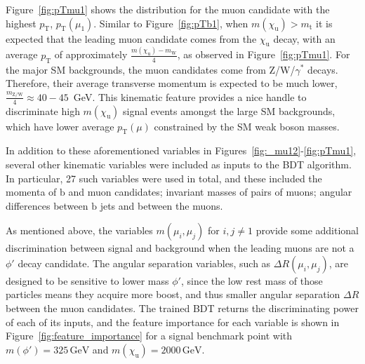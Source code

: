 Figure~\ref{fig:pTmu1} shows the  distribution for the muon candidate with the highest $p_{\mathrm{T}}$, $p_{\mathrm{T}}(\mu_{1})$. Similar to Figure~\ref{fig:pTb1}, when $m(\chi_\mathrm{u}) > m_{\mathrm{t}}$ it is expected that the leading muon candidate comes from the $\chi_\mathrm{u}$ decay, with an average $p_{\mathrm{T}}$ of approximately $\frac{m(\chi_\mathrm{u}) - m_{\mathrm{W}}}{4}$, as observed in Figure~\ref{fig:pTmu1}. For the major SM backgrounds, the muon candidates come from Z/W/$\gamma^{*}$ decays. Therefore, their average transverse momentum is expected to be much lower, $\frac{m_{\mathrm{Z/W}}}{4} \approx 40-45$~\textrm{GeV}. This kinematic feature provides a nice handle to discriminate high $m(\chi_\mathrm{u})$ signal events amongst the large SM backgrounds, which have lower average $p_{\textrm{T}}(\mu)$ constrained by the SM weak boson masses.

In addition to these aforementioned variables in Figures~\ref{fig:_mu12}-\ref{fig:pTmu1}, several other kinematic variables were included as inputs to the BDT algorithm. In particular, 27 such variables were used in total, and these included the momenta of $\mathrm{b}$ and muon candidates; invariant masses of pairs of muons; angular differences between $\mathrm{b}$ jets and between the muons. 

As mentioned above, the variables $m(\mu_{i}, \mu_{j})$ for $i, j \neq 1$ provide some additional discrimination between signal and background when the leading muons are not a $\phi'$ decay candidate. The angular separation variables, such as $\Delta R(\mu_{i}, \mu_{j})$, are designed to be sensitive to lower mass $\phi'$, since the low rest mass of those particles means they acquire more boost, and thus smaller angular separation $\Delta R$ between the muon candidates. The trained BDT returns the discriminating power of each of its inputs, and the feature importance for each variable is shown in Figure~\ref{fig:feature_importance} for a signal benchmark point with $m(\phi')=325\, \mathrm{GeV}$ and $m(\chi_\mathrm{u})=2000\, \mathrm{GeV}$.

